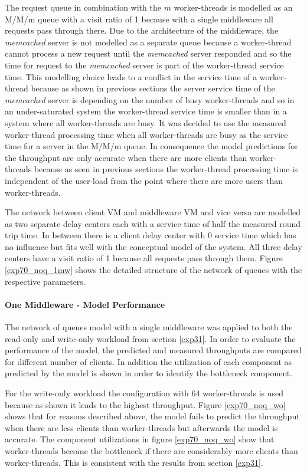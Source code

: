 \documentclass[report.tex]{subfiles}
\begin{document}
The request queue in combination with the $m$ worker-threads is modelled as an M/M/m queue with a visit ratio of 1 because with a single middleware all requests pass through there. Due to the architecture of the middleware, the \emph{memcached} server is not modelled as a separate queue because a worker-thread cannot process a new request until the \emph{memcached} server responded and so the time for request to the \emph{memcached} server is part of the worker-thread service time. This modelling choice leads to a conflict in the service time of a worker-thread because as shown in previous sections the server service time of the \emph{memcached} server is depending on the number of busy worker-threads and so in an under-saturated system the worker-thread service time is smaller than in a system where all worker-threads are busy. 
It was decided to use the measured worker-thread processing time when all worker-threads are busy as the service time for a server in the M/M/m queue. In consequence the model predictions for the throughput are only accurate when there are more clients than worker-threads because as seen in previous sections the worker-thread processing time is independent of the user-load from the point where there are more users than worker-threads.

The network between client VM and middleware VM and vice versa are modelled as two separate delay centers each with a service time of half the measured round trip time. In between there is a client delay center with 0 service time which has no influence but fits well with the conceptual model of the system. All three delay centers have a visit ratio of 1 because all requests pass through them.
Figure \ref{exp70_noq_1mw} shows the detailed structure of the network of queues with the respective parameters.

\paragraph{One Middleware - Model Performance}
The network of queues model with a single middleware was applied to both the read-only and write-only workload from section \ref{exp31}.
In order to evaluate the performance of the model, the predicted and measured throughputs are compared for different number of clients.
In addition the utilization of each component as predicted by the model is shown in order to identify the bottleneck component.


For the write-only workload the configuration with 64 worker-threads is used because as shown it leads to the highest throughput.
Figure \ref{exp70_noq_wo} shows that for reasons described above, the model fails to predict the throughput when there are less clients than worker-threads but afterwards the model is accurate. The component utilizations in figure \ref{exp70_noq_wo} show that worker-threads become the bottleneck if there are considerably more clients than worker-threads. This is consistent with the results from section \ref{exp31}.
\end{document}
